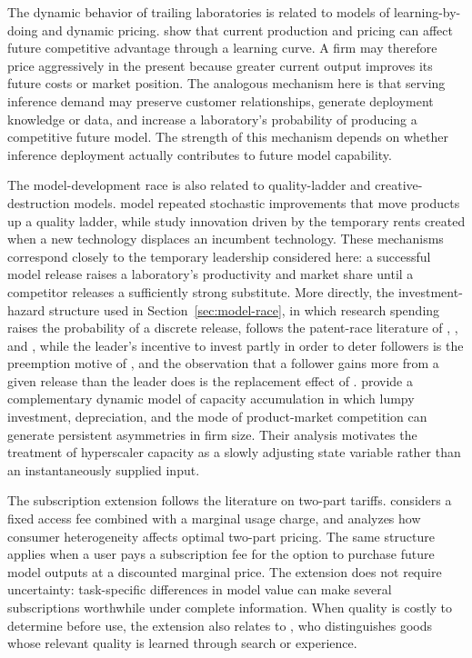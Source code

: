\documentclass[11pt]{article}
\begin{document}
The dynamic behavior of trailing laboratories is related to models of learning-by-doing and dynamic pricing. \citet{cabralRiordan1994} show that current production and pricing can affect future competitive advantage through a learning curve. A firm may therefore price aggressively in the present because greater current output improves its future costs or market position. The analogous mechanism here is that serving inference demand may preserve customer relationships, generate deployment knowledge or data, and increase a laboratory's probability of producing a competitive future model. The strength of this mechanism depends on whether inference deployment actually contributes to future model capability.

The model-development race is also related to quality-ladder and creative-destruction models. \citet{grossmanHelpman1991} model repeated stochastic improvements that move products up a quality ladder, while \citet{aghionHowitt1992} study innovation driven by the temporary rents created when a new technology displaces an incumbent technology. These mechanisms correspond closely to the temporary leadership considered here: a successful model release raises a laboratory's productivity and market share until a competitor releases a sufficiently strong substitute. More directly, the investment-hazard structure used in Section~\ref{sec:model-race}, in which research spending raises the probability of a discrete release, follows the patent-race literature of \citet{loury1979}, \citet{leeWilde1980}, and \citet{reinganum1983}, while the leader's incentive to invest partly in order to deter followers is the preemption motive of \citet{gilbertNewbery1982}, and the observation that a follower gains more from a given release than the leader does is the replacement effect of \citet{arrow1962}. \citet{besankoDoraszelski2004} provide a complementary dynamic model of capacity accumulation in which lumpy investment, depreciation, and the mode of product-market competition can generate persistent asymmetries in firm size. Their analysis motivates the treatment of hyperscaler capacity as a slowly adjusting state variable rather than an instantaneously supplied input.

The subscription extension follows the literature on two-part tariffs. \citet{oi1971} considers a fixed access fee combined with a marginal usage charge, and \citet{schmalensee1981} analyzes how consumer heterogeneity affects optimal two-part pricing. The same structure applies when a user pays a subscription fee for the option to purchase future model outputs at a discounted marginal price. The extension does not require uncertainty: task-specific differences in model value can make several subscriptions worthwhile under complete information. When quality is costly to determine before use, the extension also relates to \citet{nelson1970}, who distinguishes goods whose relevant quality is learned through search or experience.
\end{document}
